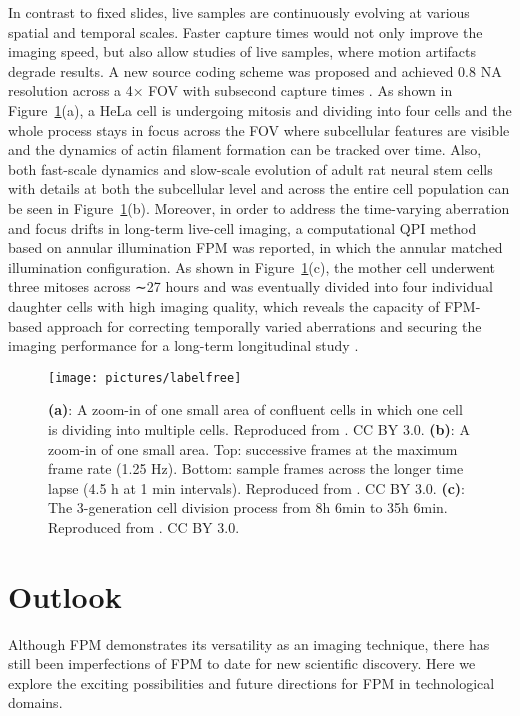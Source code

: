 \documentclass[journal,review,submit,pdftex,moreauthors]{Definitions/mdpi}
\begin{document}
In contrast to fixed slides, live samples are continuously evolving at various spatial and temporal scales. Faster capture times would not only improve the imaging speed, but also allow studies of live samples, where motion artifacts degrade results. A new source coding scheme was proposed and achieved 0.8 NA resolution across a 4× FOV with subsecond capture times \cite{tian2015computational}. As shown in Figure~\ref{labelfree}(a), a HeLa cell is undergoing mitosis and dividing into four cells and the whole process stays in focus across the FOV where subcellular features are visible and the dynamics of actin filament formation can be tracked over time. Also, both fast-scale dynamics and slow-scale evolution of adult rat neural stem cells with details at both the subcellular level and across the entire cell population can be seen in Figure~\ref{labelfree}(b). Moreover, in order to address the time-varying aberration and focus drifts in long-term live-cell imaging, a computational QPI method based on annular illumination FPM was reported, in which the annular matched illumination configuration. As shown in Figure~\ref{labelfree}(c), the mother cell underwent three mitoses across ∼27 hours and was eventually divided into four individual daughter cells with high imaging quality\cite{shu2022adaptive}, which reveals the capacity of FPM-based approach for correcting temporally varied aberrations and securing the imaging performance for a long-term longitudinal study \cite{chung2016wide, kamal2018situ, konda2021multi, aidukas2019low, shen2019computational}.


\begin{figure}[H]
\texttt{[image: pictures/labelfree]}
\caption{\textbf{(a)}: A zoom-in of one small area of confluent cells in which one cell is dividing into multiple cells. Reproduced from \cite{tian2015computational}. CC BY 3.0. \textbf{(b)}: A zoom-in of one small area. Top: successive frames at the maximum frame rate (1.25 Hz). Bottom: sample frames across the longer time lapse (4.5 h at 1 min intervals). Reproduced from \cite{tian2015computational}. CC BY 3.0. \textbf{(c)}: The 3-generation cell division process from 8h 6min to 35h 6min. Reproduced from \cite{shu2022adaptive}. CC BY 3.0.   \label{labelfree}}
\end{figure}

\section{Outlook}
Although FPM demonstrates its versatility as an imaging technique, there has still been imperfections of FPM to date for new scientific discovery. Here we explore the exciting possibilities and future directions for FPM in technological domains.
\end{document}

